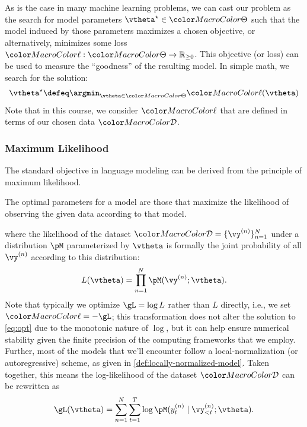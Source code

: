 As is the case in many machine learning problems, we can cast our problem as the search for model parameters $\vtheta^\star \in \paramspace$ such that the model induced by those parameters maximizes a chosen objective, or alternatively, minimizes some loss $\loss: \paramspace \rightarrow \mathbb{R}_{\geq 0}$. This objective (or loss) can be used to measure the ``goodness'' of the resulting model. 
In simple math, we search for the solution: 
\begin{equation}
\vtheta^\star \defeq \argmin_{\vtheta \in \paramspace} \loss(\vtheta)
\label{eq:opt}
\end{equation}
\noindent Note that in this course, we consider $\loss$ that are defined in terms of our chosen data $\corpus$. 

\subsubsection{Maximum Likelihood}\label{sec:standard-objective}
The standard objective in language modeling can be derived from the principle of maximum likelihood.  
\begin{principle}
The optimal parameters for a model are those that maximize the likelihood of observing the given data according to that model. 
\end{principle}
\noindent where the likelihood of the dataset $\corpus = \{ \vy^{(n)}\}_{n=1}^{N}$ under a distribution $\pM$ parameterized by $\vtheta$ is formally the joint probability of all $\vy^{(n)}$ according to this distribution:
\begin{equation}\label{eq:mle}
    L(\vtheta) = \prod_{n=1}^{N} \pM(\vy^{(n)}; \vtheta).
\end{equation}
Note that typically we optimize $\gL = \log L$ rather than $L$ directly, i.e., we set $\loss=-\gL$; this transformation does not alter the solution to \cref{eq:opt} due to the monotonic nature of $\log$, but it can help ensure numerical stability given the finite precision of the computing frameworks that we employ. Further, most of the models that we'll encounter follow a local-normalization (or autoregressive) scheme, as given in \cref{def:locally-normalized-model}. Taken together, this means the log-likelihood of the dataset $\corpus$ can be rewritten as 
\begin{equation}\label{eq:mle_decomp}
    \gL(\vtheta) = \sum_{n=1}^{N}\sum_{t=1}^T \log\pM(y_t^{(n)}\mid \vy_{<t}^{(n)}; \vtheta).
\end{equation}

